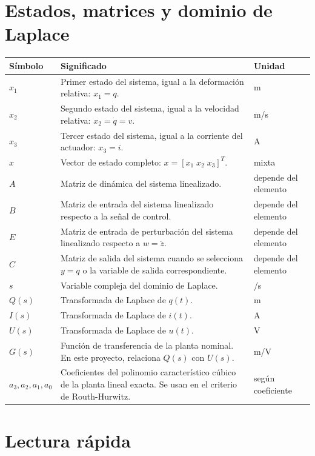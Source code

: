 \documentclass[11pt]{article}
\begin{document}
\section{Estados, matrices y dominio de Laplace}

\begin{center}
\small
\begin{tabular}{>{\raggedright\arraybackslash}p{3.0cm} >{\raggedright\arraybackslash}p{9.0cm} >{\raggedright\arraybackslash}p{2.2cm}}
\toprule
\textbf{S\'imbolo} & \textbf{Significado} & \textbf{Unidad} \\
\midrule
$x_1$ & Primer estado del sistema, igual a la deformaci\'on relativa: $x_1=q$. & m \\
$x_2$ & Segundo estado del sistema, igual a la velocidad relativa: $x_2=\dot q=v$. & m/s \\
$x_3$ & Tercer estado del sistema, igual a la corriente del actuador: $x_3=i$. & A \\
$x$ & Vector de estado completo: $x=[x_1\;x_2\;x_3]^T$. & mixta \\
$A$ & Matriz de din\'amica del sistema linealizado. & depende del elemento \\
$B$ & Matriz de entrada del sistema linealizado respecto a la se\~nal de control. & depende del elemento \\
$E$ & Matriz de entrada de perturbaci\'on del sistema linealizado respecto a $w=\ddot z$. & depende del elemento \\
$C$ & Matriz de salida del sistema cuando se selecciona $y=q$ o la variable de salida correspondiente. & depende del elemento \\
$s$ & Variable compleja del dominio de Laplace. & 1/s \\
$Q(s)$ & Transformada de Laplace de $q(t)$. & m \\
$I(s)$ & Transformada de Laplace de $i(t)$. & A \\
$U(s)$ & Transformada de Laplace de $u(t)$. & V \\
$G(s)$ & Funci\'on de transferencia de la planta nominal. En este proyecto, relaciona $Q(s)$ con $U(s)$. & m/V \\
$a_3,a_2,a_1,a_0$ & Coeficientes del polinomio caracter\'istico c\'ubico de la planta lineal exacta. Se usan en el criterio de Routh-Hurwitz. & seg\'un coeficiente \\
\bottomrule
\end{tabular}
\end{center}

\section{Lectura r\'apida}
\end{document}

